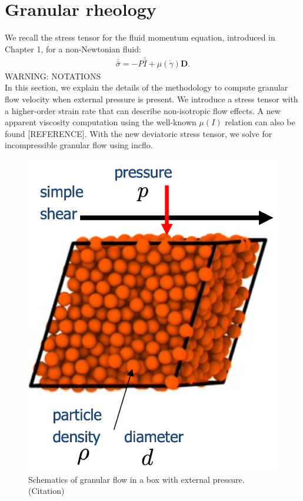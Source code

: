 \section{Granular rheology}
We recall the stress tensor for the fluid momentum equation, introduced in Chapter 1, for a non-Newtonian fluid:
\begin{align}
  \bar{\bar{\sigma}}
    = -P \bar{\bar{I}}  + \mu(\dot{\gamma}) {\bm D}.
  \end{align}
{\color{red}WARNING: NOTATIONS}
\\
In this section, we explain the details of the methodology to compute granular flow velocity when external pressure is present. We introduce a stress tensor with a higher-order strain rate that can describe non-isotropic flow effects. A new apparent viscosity computation using the well-known $\mu(I)$ relation can also be found [{\color{blue}REFERENCE}]. With the new deviatoric stress tensor, we solve for incompressible granular flow using incflo. 
\begin{figure}[ht]
  \begin{center}
    \includegraphics[scale=0.4]{figures/fig_granular_ex.png}
    \end{center}
  \caption{Schematics of granular flow in a box with external pressure.({\color{red}Citation})}
  \label{fig_Laminar_shear}
\end{figure}

